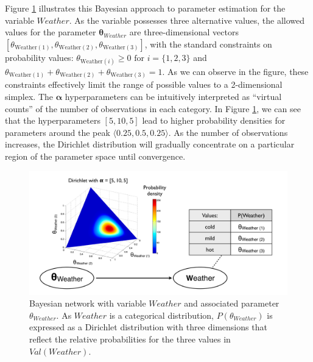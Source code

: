 Figure \ref{fig:baysianlearning} illustrates this Bayesian approach to parameter estimation for the variable $\mathit{Weather}$.  As the variable possesses three alternative values, the allowed values for the parameter $\boldsymbol\theta_{\mathit{Weather}}$ are three-dimensional vectors $[ \theta_{\mathrm{Weather}(1)}, \theta_{\mathrm{Weather}(2)}, \theta_{\mathrm{Weather}(3)} ]$, with the standard constraints on probability values: $\theta_{\mathrm{Weather}(i)} \geq 0 \text{ for } i=\{1,2,3\} $ and $\theta_{\mathrm{Weather}(1)} + \theta_{\mathrm{Weather}(2)} + \theta_{\mathrm{Weather}(3)} = 1$.   As we can observe in the figure, these constraints effectively limit the range of possible values to a 2-dimensional simplex. The $\boldsymbol\alpha$ hyperparameters can be intuitively interpreted as ``virtual counts'' of the number of observations in each category.   In Figure \ref{fig:baysianlearning}, we can see that the hyperparameters $[5,10,5]$ lead to higher probability densities for parameters around the peak $\langle 0.25, 0.5, 0.25 \rangle$.  As the number of observations increases, the Dirichlet distribution will gradually concentrate on a particular region of the parameter space until convergence.


\begin{figure}[h]
\centering
\includegraphics[scale=0.28]{imgs/bayesianlearning.pdf}
\caption{Bayesian network with variable $\mathit{Weather}$ and associated parameter $\theta_{Weather}$.  As $\mathit{Weather}$ is a categorical distribution, $P(\theta_{Weather})$ is expressed as a Dirichlet distribution with three dimensions that reflect the relative probabilities for the three values in $\mathit{Val}(\mathit{Weather})$. }
\label{fig:baysianlearning}
\end{figure}

